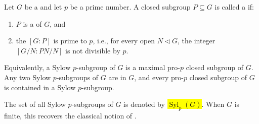 \begin{definition} \label{definition:sylow_p_subgroup_of_a_topological_group}
Let $G$ be a  and let $p$ be a prime number. A closed subgroup $P \subseteq G$ is called a  if:

\begin{enumerate}
    \item $P$ is a  of $G$, and
    \item the  $[G : P]$ is prime to $p$, i.e., for every open  $N \triangleleft G$, the integer $[G/N : PN/N]$ is not divisible by $p$.
\end{enumerate}

Equivalently, a Sylow $p$-subgroup of $G$ is a maximal pro-$p$ closed subgroup of $G$. Any two Sylow $p$-subgroups of $G$ are  in $G$, and every pro-$p$ closed subgroup of $G$ is contained in a Sylow $p$-subgroup.

The set of all Sylow $p$-subgroups of $G$ is denoted by \hl{$\operatorname{Syl}_p(G)$}. When $G$ is finite, this recovers the classical notion of .
\end{definition}
